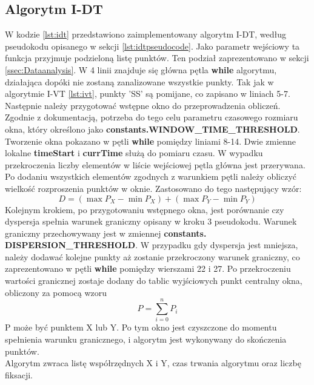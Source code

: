\subsection{Algorytm I-DT}
\label{ssec:implementidt}
W kodzie \ref{lst:idt} przedstawiono zaimplementowany algorytm I-DT, według pseudokodu opisanego w sekcji \ref{lst:idtpseudocode}. Jako parametr wejściowy ta funkcja przyjmuje podzieloną listę punktów. Ten podział zaprezentowano w sekcji \ref{ssec:Dataanalysis}. W 4 linii znajduje się główna pętla \textbf{while} algorytmu, działająca dopóki nie zostaną zanalizowane wszystkie punkty. Tak jak w algorytmie I-VT \ref{lst:ivt}, punkty 'SS' są pomijane, co zapisano w liniach 5-7. Następnie należy przygotować wstępne okno do przeprowadzenia obliczeń. Zgodnie z dokumentacją, potrzeba do tego celu parametru czasowego rozmiaru okna, który określono jako \textbf{constants.WINDOW\_TIME\_THRESHOLD}. Tworzenie okna pokazano w pętli \textbf{while} pomiędzy liniami 8-14. Dwie zmienne lokalne \textbf{timeStart} i \textbf{currTime} służą do pomiaru czasu. W wypadku przekroczenia liczby elementów w liście wejściowej pętla główna jest przerywana. Po dodaniu wszystkich elementów zgodnych z warunkiem pętli należy obliczyć wielkość rozproszenia punktów w oknie. Zastosowano do tego następujący wzór:
\[
        D = (\max{P_X} - \min{P_X}) + (\max{P_Y} - \min{P_Y})
\]
Kolejnym krokiem, po przygotowaniu wstępnego okna, jest porównanie czy dyspersja spełnia warunek graniczny opisany w kroku 3 pseudokodu. Warunek graniczny przechowywany jest w zmiennej \textbf{constants. DISPERSION\_THRESHOLD}. W przypadku gdy dyspersja jest mniejsza, należy dodawać kolejne punkty aż zostanie przekroczony warunek graniczny, co zaprezentowano w pętli \textbf{while} pomiędzy wierszami 22 i 27. Po przekroczeniu wartości granicznej zostaje dodany do tablic wyjściowych punkt centralny okna, obliczony za pomocą wzoru
\[
        P = \sum_{i = 0}^{n}{P_i}
\]
P może być punktem X lub Y. Po tym okno jest czyszczone do momentu spełnienia warunku granicznego, i algorytm jest wykonywany do skończenia punktów.\\
Algorytm zwraca listę współrzędnych X i Y, czas trwania algorytmu oraz liczbę fiksacji.
